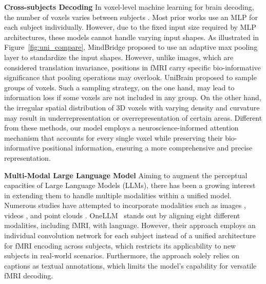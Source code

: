 \noindent\textbf{Cross-subjects Decoding}
In voxel-level machine learning for brain decoding, the number of voxels varies between subjects \citep{allen2022massive}. Most prior works \citep{scotti2024reconstructing,scotti2024mindeye2} use an MLP for each subject individually. However, due to the fixed input size required by MLP architectures, these models cannot handle varying input shapes. As illustrated in Figure~\ref{fig:uni_compare}, MindBridge \citep{wang2024mindbridge} proposed to use an adaptive max pooling layer to standardize the input shapes. However, unlike images, which are considered translation invariance, positions in fMRI carry specific bio-informative significance that pooling operations may overlook. UniBrain \citep{wang2024unibrain} proposed to sample groups of voxels. Such a sampling strategy, on the one hand, may lead to information loss if some voxels are not included in any group. On the other hand, the irregular spatial distribution of 3D voxels with varying density and curvature may result in underrepresentation or overrepresentation of certain areas. Different from these methods, our model employs a neuroscience-informed attention mechanism that accounts for every single voxel while preserving their bio-informative positional information, ensuring a more comprehensive and precise representation. 


\noindent\textbf{Multi-Modal Large Language Model}
Aiming to augment the perceptual capacities of Large Language Models (LLMs), there has been a growing interest in extending them to handle multiple modalities within a unified model. Numerous studies have attempted to incorporate modalities such as images \citep{alayrac2022flamingo,zhang2023internlm,wang2024cogvlm}, videos \citep{cheng2024videollama, kondratyuk2023videopoet,zhang2023video}, and point clouds \citep{xu2023pointllm,qi2025shapellm}. %
OneLLM~\citep{han2024onellm} stands out by aligning eight different modalities, including fMRI, with language. However, their approach employs an individual convolution network for each subject instead of a unified architecture for fMRI encoding across subjects, which restricts its applicability to new subjects in real-world scenarios. Furthermore, the approach solely relies on captions as textual annotations, which limits the model's capability for versatile fMRI decoding. 


